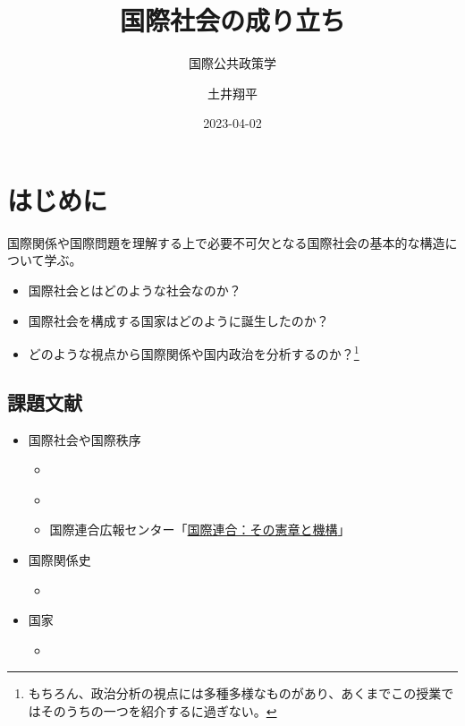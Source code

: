 \documentclass[
  xelatex,
  ja=standard]{bxjsarticle}
\title{国際社会の成り立ち}
\subtitle{国際公共政策学}
\author{土井翔平}
\date{2023-04-02}
\providecommand{\tightlist}{%
  \setlength{\itemsep}{0pt}\setlength{\parskip}{0pt}}\usepackage{longtable,booktabs,array}
\begin{document}
\maketitle
\ifdefined\Shaded\renewenvironment{Shaded}{\begin{tcolorbox}[frame hidden, interior hidden, boxrule=0pt, borderline west={3pt}{0pt}{shadecolor}, sharp corners, enhanced, breakable]}{\end{tcolorbox}}\fi

\hypertarget{ux306fux3058ux3081ux306b}{%
\section*{はじめに}\label{ux306fux3058ux3081ux306b}}

国際関係や国際問題を理解する上で必要不可欠となる国際社会の基本的な構造について学ぶ。

\begin{itemize}
\tightlist
\item
  国際社会とはどのような社会なのか？
\item
  国際社会を構成する国家はどのように誕生したのか？
\item
  どのような視点から国際関係や国内政治を分析するのか？\footnote{もちろん、政治分析の視点には多種多様なものがあり、あくまでこの授業ではそのうちの一つを紹介するに過ぎない。}
\end{itemize}

\hypertarget{ux8ab2ux984cux6587ux732e}{%
\subsection*{課題文献}\label{ux8ab2ux984cux6587ux732e}}

\begin{itemize}
\tightlist
\item
  国際社会や国際秩序

  \begin{itemize}
  \tightlist
  \item
    \citet[第3章]{nakanishi2013}
  \item
    \citet{shinoda2007}
  \item
    国際連合広報センター「\href{https://www.unic.or.jp/info/un/}{国際連合：その憲章と機構}」
  \end{itemize}
\item
  国際関係史

  \begin{itemize}
  \tightlist
  \item
    \citet[第2章]{nakanishi2013}
  \end{itemize}
\item
  国家

  \begin{itemize}
  \tightlist
  \item
    \citet[第2章]{sunahara2020}
  \end{itemize}
\end{itemize}
\end{document}
